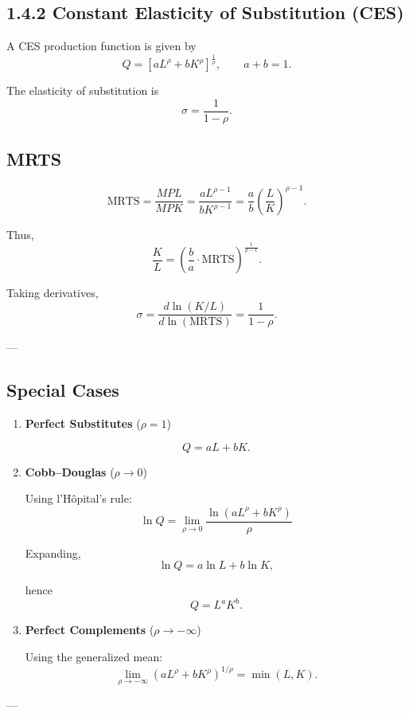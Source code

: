 \subsection*{1.4.2 Constant Elasticity of Substitution (CES)}

A CES production function is given by
\[
Q =
\left[
aL^{\rho} + bK^{\rho}
\right]^{\frac{1}{\rho}},
\qquad a + b = 1.
\]

The elasticity of substitution is
\[
\sigma = \frac{1}{1-\rho}.
\]

\subsection*{MRTS}

\[
\text{MRTS}
=
\frac{MPL}{MPK}
=
\frac{a L^{\rho-1}}{b K^{\rho-1}}
=
\frac{a}{b} \left(\frac{L}{K}\right)^{\rho-1}.
\]

Thus,
\[
\frac{K}{L}
=
\left(\frac{b}{a} \cdot \text{MRTS} \right)^{\frac{1}{\rho-1}}.
\]

Taking derivatives,
\[
\sigma
=
\frac{d \ln(K/L)}{d \ln(\text{MRTS})}
=
\frac{1}{1-\rho}.
\]

---

\subsection*{Special Cases}

\begin{enumerate}
    \item \textbf{Perfect Substitutes} ($\rho = 1$)

    \[
    Q = aL + bK.
    \]

    \item \textbf{Cobb--Douglas} ($\rho \to 0$)

    Using l'H\^opital's rule:
    \[
    \ln Q
    =
    \lim_{\rho \to 0}
    \frac{\ln(aL^\rho + bK^\rho)}{\rho}
    \]

    Expanding,
    \[
    \ln Q = a \ln L + b \ln K,
    \]

    hence
    \[
    Q = L^a K^b.
    \]

    \item \textbf{Perfect Complements} ($\rho \to -\infty$)

    Using the generalized mean:
    \[
    \lim_{\rho \to -\infty}
    \left( aL^\rho + bK^\rho \right)^{1/\rho}
    =
    \min(L,K).
    \]
\end{enumerate}

---

